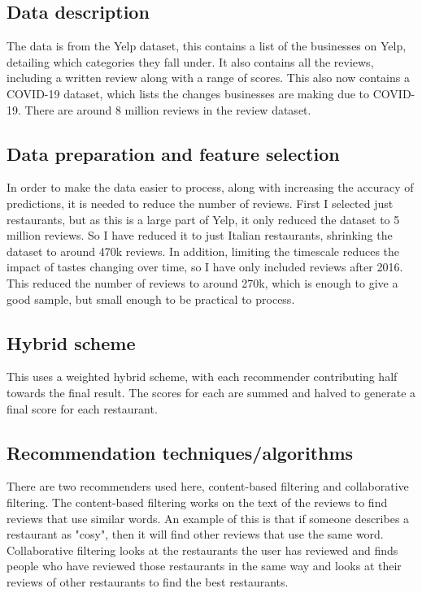 \documentclass[conference]{IEEEtran}
\begin{document}
\subsection{Data description}

The data is from the Yelp dataset, this contains a list of the businesses on Yelp, detailing which categories they fall under. It also contains all the reviews, including a written review along with a range of scores. This also now contains a COVID-19 dataset, which lists the changes businesses are making due to COVID-19. There are around 8 million reviews in the review dataset.

\subsection{Data preparation and feature selection}

In order to make the data easier to process, along with increasing the accuracy of predictions, it is needed to reduce the number of reviews. First I selected just restaurants, but as this is a large part of Yelp, it only reduced the dataset to 5 million reviews. So I have reduced it to just Italian restaurants, shrinking the dataset to around 470k reviews. In addition, limiting the timescale reduces the impact of tastes changing over time, so I have only included reviews after 2016. This reduced the number of reviews to around 270k, which is enough to give a good sample, but small enough to be practical to process.

\subsection{Hybrid scheme}

This uses a weighted hybrid scheme, with each recommender contributing half towards the final result. The scores for each are summed and halved to generate a final score for each restaurant.

\subsection{Recommendation techniques/algorithms}

There are two recommenders used here, content-based filtering and collaborative filtering. The content-based filtering works on the text of the reviews to find reviews that use similar words. An example of this is that if someone describes a restaurant as "cosy", then it will find other reviews that use the same word. Collaborative filtering looks at the restaurants the user has reviewed and finds people who have reviewed those restaurants in the same way and looks at their reviews of other restaurants to find the best restaurants.
\end{document}
